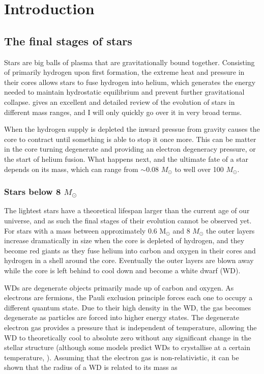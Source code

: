 \documentclass[a4paper,oneside,12pt, class=Latex/Classes/PhDthesisPSnPDF, crop=false]{standalone}
\begin{document}
\doublespacing
\chapter{Introduction}
\label{chap:intro}

\section{The final stages of stars}
Stars are big balls of plasma that are gravitationally bound together. Consisting of primarily hydrogen upon first formation, the extreme heat and pressure in their cores allows stars to fuse hydrogen into helium, which generates the energy needed to maintain hydrostatic equilibrium and prevent further gravitational collapse. \citet{starstruct} gives an excellent and detailed review of the evolution of stars in different mass ranges, and I will only quickly go over it in very broad terms.

When the hydrogen supply is depleted the inward pressue from gravity causes the core to contract until something is able to stop it once more. This can be matter in the core turning degenerate and providing an electron degeneracy pressure, or the start of helium fusion. What happens next, and the ultimate fate of a star depends on its mass, which can range from $\sim0.08$ $M_\odot$ to well over 100 $M_\odot$.


\subsection{Stars below 8 $M_\odot$}
\label{interm_mass_stars}
The lightest stars have a theoretical lifespan larger than the current age of our universe, and as such the final stages of their evolution cannot be observed yet. For stars with a mass between approximately 0.6 M$_\odot$ and 8 $M_\odot$ the outer layers increase dramatically in size when the core is depleted of hydrogen, and they become red giants as they fuse helium into carbon and oxygen in their cores and hydrogen in a shell around the core. Eventually the outer layers are blown away while the core is left behind to cool down and become a white dwarf (WD).

WDs are degenerate objects primarily made up of carbon and oxygen. As electrons are fermions, the Pauli exclusion principle \citep{Pauli} forces each one to occupy a different quantum state. Due to their high density in the WD, the gas becomes degenerate as particles are forced into higher energy states. The degenerate electron gas provides a pressure that is independent of temperature, allowing the WD to theoretically cool to absolute zero without any significant change in the stellar structure (although some models predict WDs to crystallise at a certain temperature, \citealt{WD_crystal_Mochkovitch, WD_crystal_Isern}). Assuming that the electron gas is non-relativistic, it can be shown that the radius of a WD is related to its mass as
\end{document}
